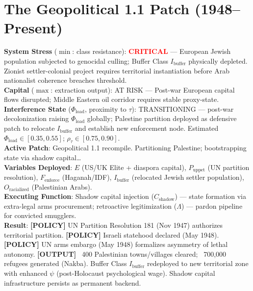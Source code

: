 \providecommand{\SourceNote}[1]{\footnote{#1}}

\chapter{The Geopolitical 1.1 Patch (1948--Present)}
\label{ch:geopolitical_patch}

\begin{tcolorbox}[colback=black!5, colframe=black!70, fonttitle=\bfseries\ttfamily, title=RUNTIME LOG: 1947--1948 (UNITED NATIONS $\rightarrow$ TEL AVIV $\rightarrow$ WASHINGTON)]
\ttfamily\small
\textbf{System Stress} ($\min$: class resistance): \textcolor{red}{\textbf{CRITICAL}} --- European Jewish population subjected to genocidal culling; Buffer Class $I_{\text{buffer}}$ physically depleted. Zionist settler-colonial project requires territorial instantiation before Arab nationalist coherence breaches threshold.\\
\textbf{Capital} ($\max$: extraction output): AT RISK --- Post-war European capital flows disrupted; Middle Eastern oil corridor requires stable proxy-state.\\
\textbf{Interference State} ($\Phi_{\text{load}}$, proximity to $\tau$): TRANSITIONING --- post-war decolonization raising $\Phi_{\text{load}}$ globally; Palestine partition deployed as defensive patch to relocate $I_{\text{buffer}}$ and establish new enforcement node. Estimated $\Phi_{\text{load}} \in [0.35, 0.55]$; $\rho_{\tau} \in [0.75, 0.90]$.\\
\textbf{Active Patch}: Geopolitical 1.1 recompile. Partitioning Palestine; bootstrapping state via shadow capital\ldots\\
\textbf{Variables Deployed}: $E$ (US/UK Elite + diaspora capital), $P_{\text{uppet}}$ (UN partition resolution), $F_{\text{enforce}}$ (Haganah/IDF), $I_{\text{buffer}}$ (relocated Jewish settler population), $O_{\text{racialized}}$ (Palestinian Arabs).\\
\textbf{Executing Function}: Shadow capital injection ($C_{\text{shadow}}$) --- state formation via extra-legal arms procurement; retroactive legitimization ($\Lambda$) --- pardon pipeline for convicted smugglers.\\
\textbf{Result}: \textbf{[POLICY]} UN Partition Resolution 181 (Nov 1947) authorizes territorial partition. \textbf{[POLICY]} Israeli statehood declared (May 1948). \textbf{[POLICY]} UN arms embargo (May 1948) formalizes asymmetry of lethal autonomy. \textbf{[OUTPUT]} ~400 Palestinian towns/villages cleared; ~700,000 refugees generated (Nakba). Buffer Class $I_{\text{buffer}}$ redeployed to new territorial zone with enhanced $\psi$ (post-Holocaust psychological wage). Shadow capital infrastructure persists as permanent backend.
\end{tcolorbox}

